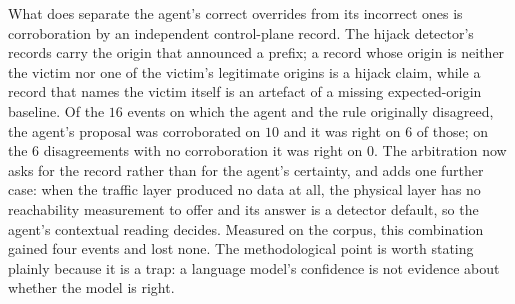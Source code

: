 What does separate the agent's correct overrides from its incorrect ones
is corroboration by an independent control-plane record. The hijack
detector's records carry the origin that announced a prefix; a record
whose origin is neither the victim nor one of the victim's legitimate
origins is a hijack claim, while a record that names the victim itself is
an artefact of a missing expected-origin baseline. Of the $16$ events on
which the agent and the rule originally disagreed, the agent's proposal was
corroborated on $10$ and it was right on $6$ of those; on the $6$
disagreements with no corroboration it was right on $0$. The arbitration
now asks for the record rather than for the agent's certainty, and adds one
further case: when the traffic layer produced no data at all, the physical
layer has no reachability measurement to offer and its answer is a
detector default, so the agent's contextual reading decides. Measured on
the corpus, this combination gained four events and lost none. The
methodological point is worth stating plainly because it is a trap: a
language model's confidence is not evidence about whether the model is
right.

